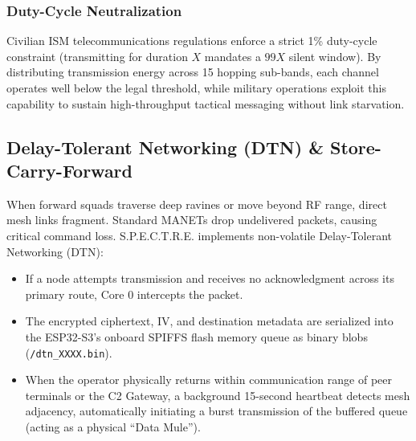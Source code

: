 \documentclass[conference]{IEEEtran}
\begin{document}
\subsubsection{Duty-Cycle Neutralization}
Civilian ISM telecommunications regulations enforce a strict 1\% duty-cycle constraint (transmitting for duration $X$ mandates a $99X$ silent window). By distributing transmission energy across 15 hopping sub-bands, each channel operates well below the legal threshold, while military operations exploit this capability to sustain high-throughput tactical messaging without link starvation.

\subsection{Delay-Tolerant Networking (DTN) \& Store-Carry-Forward}
When forward squads traverse deep ravines or move beyond RF range, direct mesh links fragment. Standard MANETs drop undelivered packets, causing critical command loss. S.P.E.C.T.R.E. implements non-volatile Delay-Tolerant Networking (DTN):
\begin{itemize}
    \item If a node attempts transmission and receives no acknowledgment across its primary route, Core 0 intercepts the packet.
    \item The encrypted ciphertext, IV, and destination metadata are serialized into the ESP32-S3's onboard SPIFFS flash memory queue as binary blobs (\texttt{/dtn\_XXXX.bin}).
    \item When the operator physically returns within communication range of peer terminals or the C2 Gateway, a background 15-second heartbeat detects mesh adjacency, automatically initiating a burst transmission of the buffered queue (acting as a physical ``Data Mule'').
\end{itemize}
\end{document}
